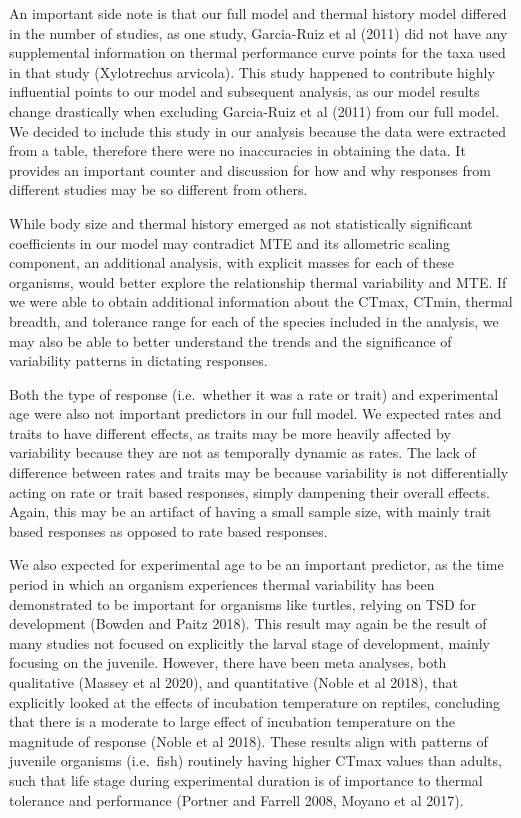 \documentclass[12pt,twoside]{reedthesis}
\begin{document}
An important side note is that our full model and thermal history model differed in the number of studies, as one study, Garcia-Ruiz et al (2011) did not have any supplemental information on thermal performance curve points for the taxa used in that study (Xylotrechus arvicola). This study happened to contribute highly influential points to our model and subsequent analysis, as our model results change drastically when excluding Garcia-Ruiz et al (2011) from our full model. We decided to include this study in our analysis because the data were extracted from a table, therefore there were no inaccuracies in obtaining the data. It provides an important counter and discussion for how and why responses from different studies may be so different from others.

While body size and thermal history emerged as not statistically significant coefficients in our model may contradict MTE and its allometric scaling component, an additional analysis, with explicit masses for each of these organisms, would better explore the relationship thermal variability and MTE. If we were able to obtain additional information about the CTmax, CTmin, thermal breadth, and tolerance range for each of the species included in the analysis, we may also be able to better understand the trends and the significance of variability patterns in dictating responses.

Both the type of response (i.e.~whether it was a rate or trait) and experimental age were also not important predictors in our full model. We expected rates and traits to have different effects, as traits may be more heavily affected by variability because they are not as temporally dynamic as rates. The lack of difference between rates and traits may be because variability is not differentially acting on rate or trait based responses, simply dampening their overall effects. Again, this may be an artifact of having a small sample size, with mainly trait based responses as opposed to rate based responses.

We also expected for experimental age to be an important predictor, as the time period in which an organism experiences thermal variability has been demonstrated to be important for organisms like turtles, relying on TSD for development (Bowden and Paitz 2018). This result may again be the result of many studies not focused on explicitly the larval stage of development, mainly focusing on the juvenile. However, there have been meta analyses, both qualitative (Massey et al 2020), and quantitative (Noble et al 2018), that explicitly looked at the effects of incubation temperature on reptiles, concluding that there is a moderate to large effect of incubation temperature on the magnitude of response (Noble et al 2018). These results align with patterns of juvenile organisms (i.e.~fish) routinely having higher CTmax values than adults, such that life stage during experimental duration is of importance to thermal tolerance and performance (Portner and Farrell 2008, Moyano et al 2017).
\end{document}
